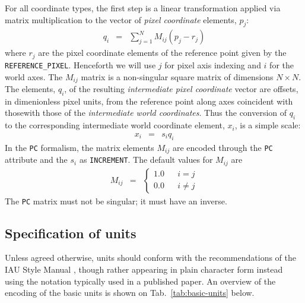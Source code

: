 \documentclass[a4paper,10pt,bibtotoc]{scrreprt}
\begin{document}
For all coordinate types, the first step is a linear transformation
applied via matrix multiplication to the vector of \textsl{pixel
  coordinate} elements, $p_{j}$:
\begin{eqnarray}
  \label{eq:6}
  q_{i} & = & \sum^{N}_{j=1} M_{ij} \left( p_{j} - r_{j} \right)
\end{eqnarray}
where $r_{j}$ are the pixel coordinate elements of the reference point
given by the \verb|REFERENCE_PIXEL|. Henceforth we will use $j$ for
pixel axis indexing and $i$ for the world axes. The $M_{ij}$ matrix is
a non-singular square matrix of dimensions $N \times N$.
The elements, $q_{i}$, of the resulting \textsl{intermediate pixel
  coordinate} vector are offsets, in dimenionless pixel units, from
the reference point along axes coincident with thosewith those of the
\textsl{intermediate world coordinates}. Thus the conversion of
$q_{i}$ to the corresponding intermediate world coordinate element,
$x_{i}$, is a simple scale:
\begin{eqnarray}
  \label{eq:7}
  x_i & = & s_i q_i
\end{eqnarray}
In the \texttt{PC} formalism, the matrix elements $M_{ij}$ are encoded
through the \texttt{PC} attribute and the $s_i$ as
\texttt{INCREMENT}. The default values for $M_{ij}$ are
\begin{eqnarray}
  \label{eq:8}
  M_{ij} & = & \left\{
    \begin{array}{lll}
      1.0 & & i = j \\
      0.0 & & i \neq j
    \end{array}
  \right.
\end{eqnarray}
The \texttt{PC} matrix must not be singular; it must have an inverse.

\subsection{Specification of units}

Unless agreed otherwise, units should conform with the recommendations of the
IAU Style Manual \cite{mcnally.1988}, though rather appearing in plain
character form \cite{george.1995, ochsenbein.1996} instead using the
notation typically used in a published paper. An overview of the
encoding of the basic units is shown on Tab.~\ref{tab:basic-units} below.

\end{document}
